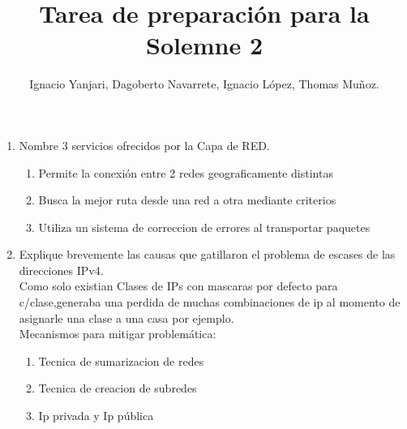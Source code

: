 \documentclass{udparticle}
\title{Tarea de preparación para la Solemne 2}
\author{Ignacio Yanjari, Dagoberto Navarrete, Ignacio López, Thomas Muñoz.}
\begin{document}
\maketitle
\begin{enumerate}
\item Nombre 3 servicios ofrecidos por la Capa de RED.

\begin{enumerate}
	\item Permite la conexión entre 2 redes geograficamente distintas
	\item Busca la mejor ruta desde una red a otra mediante criterios
	\item Utiliza un sistema de correccion de errores al transportar paquetes
\end{enumerate}

\item Explique brevemente las causas que gatillaron el problema de escases de las direcciones IPv4.\\
Como solo existian Clases de IPs con mascaras por defecto para c/clase,generaba una 
perdida de muchas combinaciones de ip al momento de asignarle una clase a una casa por 
ejemplo.\\
Mecanismos para mitigar problemática:

\begin{enumerate}
	\item Tecnica de sumarizacion de redes 
	\item Tecnica de  creacion de subredes
	\item Ip privada y Ip pública
\end{enumerate}


\end{enumerate}
\end{document}
